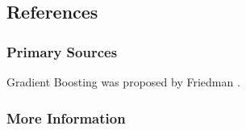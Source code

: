 \subsection{References}

\subsubsection{Primary Sources}

Gradient Boosting was proposed by Friedman \cite{Friedman2001}.

\subsubsection{More Information}



